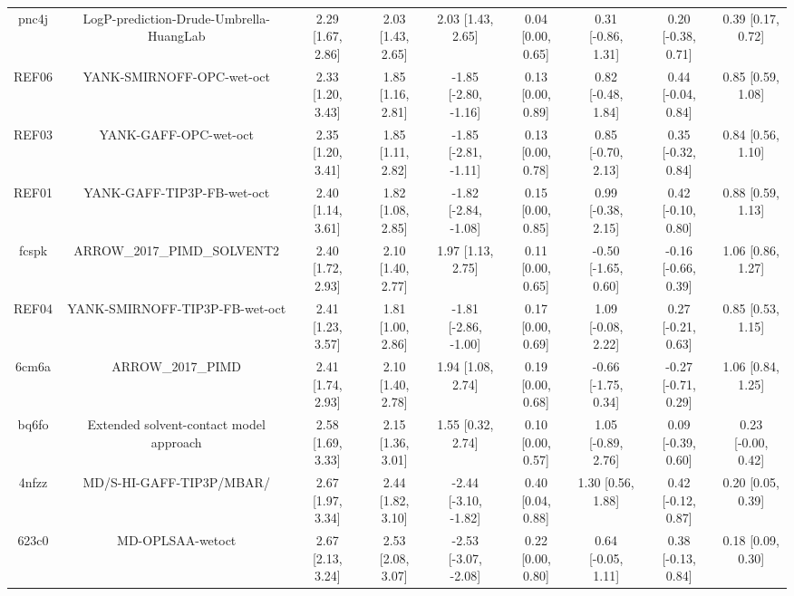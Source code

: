 \documentclass{article}
\begin{document}
\begin{center}
\begin{longtable}{|ccccccccc|}
 pnc4j &            LogP-prediction-Drude-Umbrella-HuangLab &  2.29 [1.67, 2.86] &  2.03 [1.43, 2.65] &     2.03 [1.43, 2.65] &  0.04 [0.00, 0.65] &   0.31 [-0.86, 1.31] &   0.20 [-0.38, 0.71] &     0.39 [0.17, 0.72] \\
 REF06 &                          YANK-SMIRNOFF-OPC-wet-oct &  2.33 [1.20, 3.43] &  1.85 [1.16, 2.81] &  -1.85 [-2.80, -1.16] &  0.13 [0.00, 0.89] &   0.82 [-0.48, 1.84] &   0.44 [-0.04, 0.84] &     0.85 [0.59, 1.08] \\
 REF03 &                              YANK-GAFF-OPC-wet-oct &  2.35 [1.20, 3.41] &  1.85 [1.11, 2.82] &  -1.85 [-2.81, -1.11] &  0.13 [0.00, 0.78] &   0.85 [-0.70, 2.13] &   0.35 [-0.32, 0.84] &     0.84 [0.56, 1.10] \\
 REF01 &                         YANK-GAFF-TIP3P-FB-wet-oct &  2.40 [1.14, 3.61] &  1.82 [1.08, 2.85] &  -1.82 [-2.84, -1.08] &  0.15 [0.00, 0.85] &   0.99 [-0.38, 2.15] &   0.42 [-0.10, 0.80] &     0.88 [0.59, 1.13] \\
 fcspk &                        ARROW\_2017\_PIMD\_SOLVENT2 &  2.40 [1.72, 2.93] &  2.10 [1.40, 2.77] &     1.97 [1.13, 2.75] &  0.11 [0.00, 0.65] &  -0.50 [-1.65, 0.60] &  -0.16 [-0.66, 0.39] &     1.06 [0.86, 1.27] \\
 REF04 &                     YANK-SMIRNOFF-TIP3P-FB-wet-oct &  2.41 [1.23, 3.57] &  1.81 [1.00, 2.86] &  -1.81 [-2.86, -1.00] &  0.17 [0.00, 0.69] &   1.09 [-0.08, 2.22] &   0.27 [-0.21, 0.63] &     0.85 [0.53, 1.15] \\
 6cm6a &                                  ARROW\_2017\_PIMD &  2.41 [1.74, 2.93] &  2.10 [1.40, 2.78] &     1.94 [1.08, 2.74] &  0.19 [0.00, 0.68] &  -0.66 [-1.75, 0.34] &  -0.27 [-0.71, 0.29] &     1.06 [0.84, 1.25] \\
 bq6fo &            Extended solvent-contact model approach &  2.58 [1.69, 3.33] &  2.15 [1.36, 3.01] &     1.55 [0.32, 2.74] &  0.10 [0.00, 0.57] &   1.05 [-0.89, 2.76] &   0.09 [-0.39, 0.60] &    0.23 [-0.00, 0.42] \\
 4nfzz &                           MD/S-HI-GAFF-TIP3P/MBAR/ &  2.67 [1.97, 3.34] &  2.44 [1.82, 3.10] &  -2.44 [-3.10, -1.82] &  0.40 [0.04, 0.88] &    1.30 [0.56, 1.88] &   0.42 [-0.12, 0.87] &     0.20 [0.05, 0.39] \\
 623c0 &                                   MD-OPLSAA-wetoct &  2.67 [2.13, 3.24] &  2.53 [2.08, 3.07] &  -2.53 [-3.07, -2.08] &  0.22 [0.00, 0.80] &   0.64 [-0.05, 1.11] &   0.38 [-0.13, 0.84] &     0.18 [0.09, 0.30] \\

\end{longtable}
\end{center}
\end{document}
